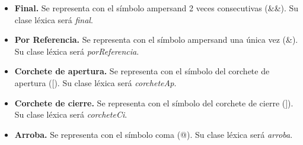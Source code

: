 \begin{itemize}
    \item \textbf{Final.} Se representa con el símbolo ampersand 2 veces consecutivas (\&\&). Su clase léxica será \textit{final}.
    \item \textbf{Por Referencia.} Se representa con el símbolo ampersand una única vez (\&). Su clase léxica será \textit{porReferencia}.
    \item \textbf{Corchete de apertura.} Se representa con el símbolo del corchete de apertura ([). Su clase léxica será \textit{corcheteAp}.
    \item \textbf{Corchete de cierre.} Se representa con el símbolo del corchete de cierre (]). Su clase léxica será \textit{corcheteCi}.
    \item \textbf{Arroba.} Se representa con el símbolo coma (@). Su clase léxica será \textit{arroba}.
\end{itemize}
